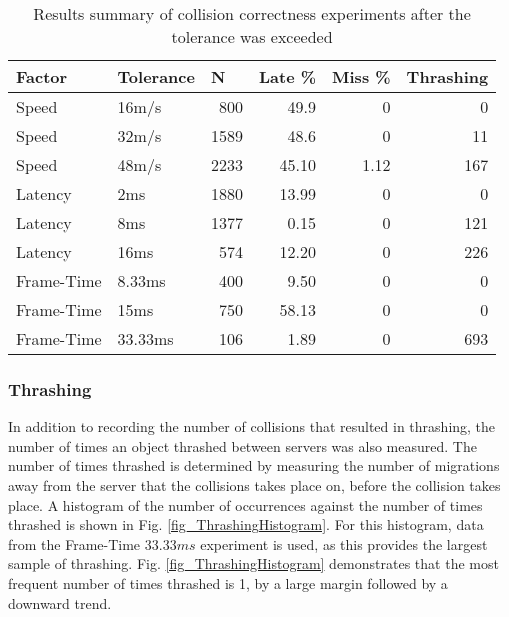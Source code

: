 \begin{table}
	\centering
	\begin{tabular}{llrrrr}
		\toprule
		\multicolumn{1}{l}{Factor} & \multicolumn{1}{l}{Tolerance} & \multicolumn{1}{l}{N} & \multicolumn{1}{l}{Late \%} & \multicolumn{1}{l}{Miss \%} & \multicolumn{1}{l}{Thrashing}  \\ 
		\hline
		Speed      & 16m/s     & 800  &   49.9  & 0           & 0               \\
		Speed      & 32m/s     & 1589  &  48.6  & 0           & 11              \\
		Speed      & 48m/s     & 2233  &  45.10 & 1.12        & 167             \\
		Latency    & 2ms       & 1880  &  13.99 & 0           & 0               \\
		Latency    & 8ms       & 1377  &  0.15  & 0           & 121             \\
		Latency    & 16ms      & 574  &   12.20 & 0           & 226             \\
		Frame-Time & 8.33ms    & 400  &   9.50  & 0           & 0               \\
		Frame-Time & 15ms      & 750  &   58.13 & 0           & 0               \\
		Frame-Time & 33.33ms   & 106  &   1.89  & 0           & 693             \\
		\bottomrule
	\end{tabular}
	\caption{Results summary of collision correctness experiments after the tolerance was exceeded}
	\label{tab_AboveTolerance}
\end{table}

\subsubsection{Thrashing}
In addition to recording the number of collisions that resulted in thrashing, the number of times an object thrashed between servers was also measured. The number of times thrashed is determined by measuring the number of migrations away from the server that the collisions takes place on, before the collision takes place. A histogram of the number of occurrences against the number of times thrashed is shown in Fig. \ref{fig_ThrashingHistogram}. For this histogram, data from the Frame-Time $33.33ms$ experiment is used, as this provides the largest sample of thrashing. Fig. \ref{fig_ThrashingHistogram} demonstrates that the most frequent number of times thrashed is 1, by a large margin followed by a downward trend.

